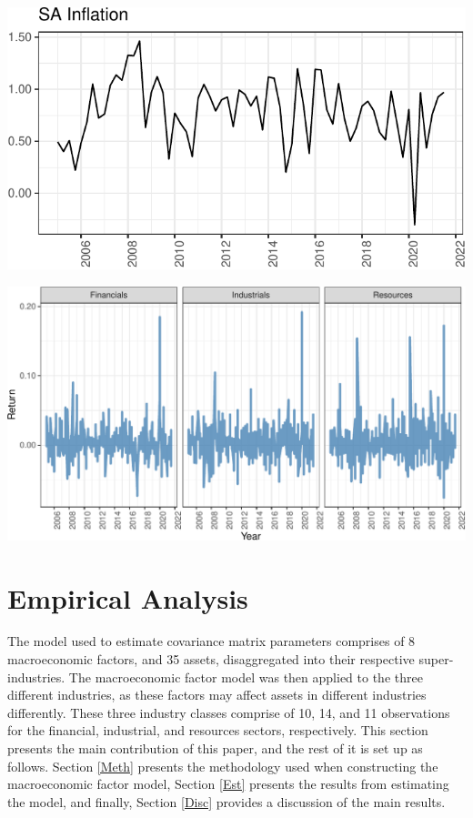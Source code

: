 \documentclass[11pt,preprint, authoryear]{elsarticle}
\let\origfigure\figure
\let\endorigfigure\endfigure
\renewenvironment{figure}[1][2] {
    \expandafter\origfigure\expandafter[H]
} {
    \endorigfigure
}
\numberwithin{equation}{section}
\numberwithin{figure}{section}
\numberwithin{table}{section}
\begin{document}
\begin{figure}[H]
\includegraphics{Factor-Model_files/figure-latex/unnamed-chunk-10-1} \caption{South Africa Consumer Price Inflation \label{Fig8}}\label{fig:unnamed-chunk-10}
\end{figure}

\begin{figure}[H]
\includegraphics{Factor-Model_files/figure-latex/unnamed-chunk-11-1} \caption{Asset Returns by Industry \label{Fig9}}\label{fig:unnamed-chunk-11}
\end{figure}

\newpage

\hypertarget{empirical-analysis}{%
\section{\texorpdfstring{Empirical Analysis
\label{Emp}}{Empirical Analysis }}\label{empirical-analysis}}

The model used to estimate covariance matrix parameters comprises of 8
macroeconomic factors, and 35 assets, disaggregated into their
respective super-industries. The macroeconomic factor model was then
applied to the three different industries, as these factors may affect
assets in different industries differently. These three industry classes
comprise of 10, 14, and 11 observations for the financial, industrial,
and resources sectors, respectively. This section presents the main
contribution of this paper, and the rest of it is set up as follows.
Section \ref{Meth} presents the methodology used when constructing the
macroeconomic factor model, Section \ref{Est} presents the results from
estimating the model, and finally, Section \ref{Disc} provides a
discussion of the main results.
\end{document}
